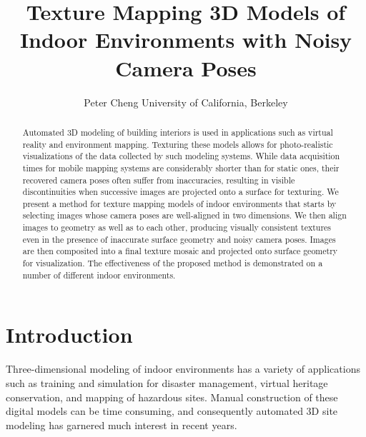 \documentclass[]{spie}  %
\title{Texture Mapping 3D Models of Indoor Environments with Noisy Camera Poses}
\author{Peter Cheng
\skiplinehalf
University of California, Berkeley\\
}
\begin{document}
\maketitle

\begin{abstract}
  Automated 3D modeling of building interiors is used in applications
  such as virtual reality and environment mapping. Texturing these
  models allows for photo-realistic visualizations of the data
  collected by such modeling systems. While data acquisition times for
  mobile mapping systems are considerably shorter than for static
  ones, their recovered camera poses often suffer from inaccuracies,
  resulting in visible discontinuities when successive images are
  projected onto a surface for texturing. We present a method for
  texture mapping models of indoor environments that starts by
  selecting images whose camera poses are well-aligned in two
  dimensions. We then align images to geometry as well as to each
  other, producing visually consistent textures even in the presence
  of inaccurate surface geometry and noisy camera poses. Images are
  then composited into a final texture mosaic and projected onto
  surface geometry for visualization. The effectiveness of the
  proposed method is demonstrated on a number of different indoor
  environments.
\end{abstract}



\section{Introduction}
\label{sec:introduction} %
Three-dimensional modeling of indoor environments has a variety of
applications such as training and simulation for disaster management,
virtual heritage conservation, and mapping of hazardous sites. Manual
construction of these digital models can be time consuming, and
consequently automated 3D site modeling has garnered much interest in
recent years.
\end{document}

